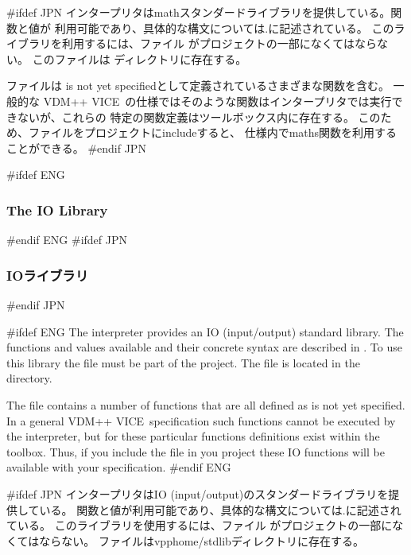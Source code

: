\documentclass[\pformat,12pt]{article}
\newcommand{\vdmslpp}{VDM-SL}
\newcommand{\vdmslpp}{VDM++}
\renewcommand{\vdmslpp}{VDM++ VICE}
\newcommand{\keyw}[1]{{\sf #1}}
\begin{document}
#ifdef JPN
インタープリタはmathスタンダードライブラリを提供している。関数と値が
利用可能であり、具体的な構文については\cite{LangMan-SCSK}.に記述されている。
このライブラリを利用するには、ファイル
がプロジェクトの一部になくてはならない。
このファイルは ディレクトリに存在する。

ファイルは
\keyw{is not yet specified}として定義されているさまざまな関数を含む。
一般的な \vdmslpp\ の仕様ではそのような関数はインタープリタでは実行できないが、これらの
特定の関数定義はツールボックス内に存在する。
このため、ファイルをプロジェクトにincludeすると、
仕様内でmaths関数を利用することができる。
#endif JPN

#ifdef ENG
\subsubsection*{The IO Library}
#endif ENG
#ifdef JPN
\subsubsection*{IOライブラリ}
#endif JPN

#ifdef ENG
The interpreter provides an IO (input/output) standard library. The
functions and values available and their concrete syntax are described
in \cite{LangMan-SCSK}. 
To use this library the file
must be part of the project.
The file is located
in the  directory.

The  
file contains a number of functions that
are all defined as \keyw{is not yet specified}. In a general \vdmslpp\
specification such functions cannot be executed by the interpreter,
but for these particular functions definitions exist within the
toolbox.  Thus, if you include the \ifthenelse{\boolean{VDMsl}}{{\tt
io.vdm}}{{\tt io.vpp}} file in you
project these IO functions will be available with your
specification.
#endif ENG

#ifdef JPN
インタープリタはIO (input/output)のスタンダードライブラリを提供している。
関数と値が利用可能であり、具体的な構文については\cite{LangMan-SCSK}.に記述されている。
このライブラリを使用するには、ファイル
がプロジェクトの一部になくてはならない。
ファイルはvpphome/stdlibディレクトリに存在する。
\end{document}
